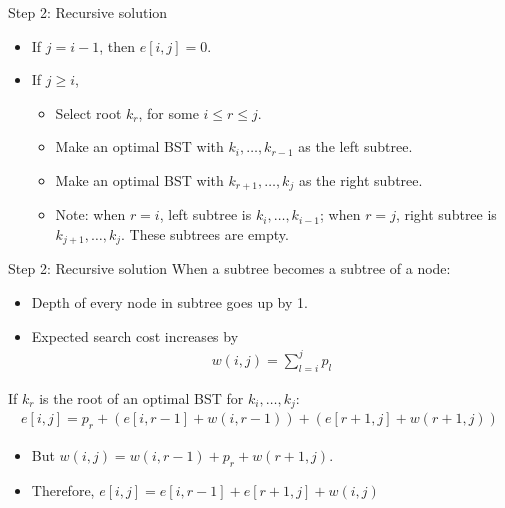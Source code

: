 \documentclass{beamer}
\begin{document}
\begin{frame}{Step 2: Recursive solution}
    \begin{itemize}
        \item If $j = i - 1$, then $e[i, j] = 0$.
        \item If $j \geq i$,
            \begin{itemize}
                \item Select root $k_r$, for some $i \leq r \leq j$.
                \item Make an optimal BST with $k_i, \ldots, k_{r-1}$ as the left subtree.
                \item Make an optimal BST with $k_{r+1}, \ldots, k_j$ as the right subtree.
                \item Note: when $r = i$, left subtree is $k_i, \dots, k_{i-1}$; when $r = j$, right subtree is $k_{j+1}, \ldots, k_j$.  These subtrees are empty.
            \end{itemize}
    \end{itemize}
\end{frame}

\begin{frame}{Step 2: Recursive solution}
    When a subtree becomes a subtree of a node:
    \begin{itemize}
        \item Depth of every node in subtree goes up by 1.
        \item Expected search cost increases by
            \begin{equation*}
                \begin{align*}
                    w(i, j) = \sum_{l = i}^{j} p_l
                \end{align*}
            \end{equation*}
    \end{itemize}
    If $k_r$ is the root of an optimal BST for $k_i, \ldots, k_j$:
        \begin{equation*}
            \begin{align*}
                e[i, j] = p_r + (e[i, r-1] + w(i, r-1)) + (e[r+1, j] + w(r+1, j))
            \end{align*}
        \end{equation*}
    \begin{itemize}
        \item But $w(i, j) = w(i, r-1) + p_r + w(r+1, j)$.
        \item Therefore, $e[i, j] = e[i,r-1] + e[r+1, j] + w(i, j)$
    \end{itemize}
\end{frame}
\end{document}
